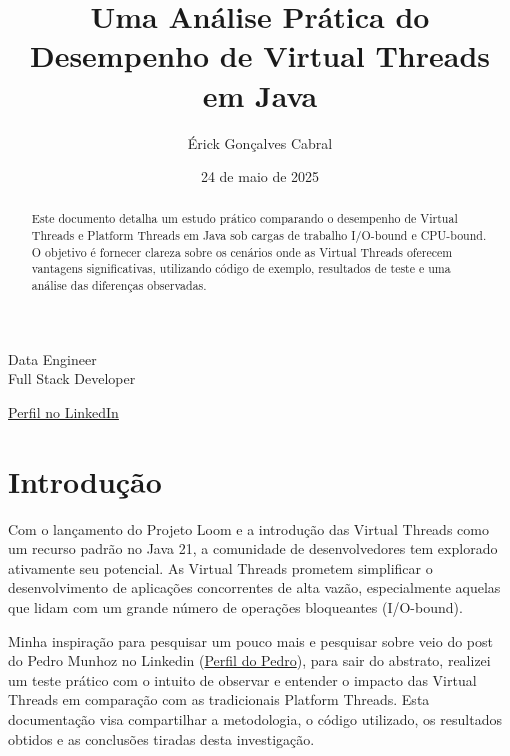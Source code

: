 \documentclass[12pt,a4paper]{article}
\title{Uma Análise Prática do Desempenho de Virtual Threads em Java}
\author{Érick Gonçalves Cabral} \\
\date{24 de maio de 2025}
\newcommand{\linkedinErickCabral}{https://www.linkedin.com/in/erick-cabralgca}
\newcommand{\linkedinPedroMunhoz}{https://www.linkedin.com/in/pedro-munhoz-675847222}
\begin{document}
\makeatletter 
\begin{titlepage}
    \centering 
    \vspace*{2.0cm} 
    {\Large \@author \par} 
    \vspace{0.4cm} 
    {\normalsize Data Engineer \\
    Full Stack Developer \par}
    \vfill 

    {\Huge \bfseries \@title \par} 

    \vfill 
    {\large \href{\linkedinErickCabral}{Perfil no LinkedIn} \par} 
    
    \vspace{0.5cm} 
    {\large \@date \par} 
    \vspace*{2cm} 

    \thispagestyle{empty} 
\end{titlepage}
\makeatother 

\begin{abstract}
Este documento detalha um estudo prático comparando o desempenho de Virtual Threads e Platform Threads em Java sob cargas de trabalho I/O-bound e CPU-bound. O objetivo é fornecer clareza sobre os cenários onde as Virtual Threads oferecem vantagens significativas, utilizando código de exemplo, resultados de teste e uma análise das diferenças observadas.
\end{abstract}
\clearpage 
\tableofcontents
\clearpage

\section{Introdução}
Com o lançamento do Projeto Loom e a introdução das Virtual Threads como um recurso padrão no Java 21, a comunidade de desenvolvedores tem explorado ativamente seu potencial. As Virtual Threads prometem simplificar o desenvolvimento de aplicações concorrentes de alta vazão, especialmente aquelas que lidam com um grande número de operações bloqueantes (I/O-bound).

Minha inspiração para pesquisar um pouco mais e pesquisar sobre veio do post do Pedro Munhoz no Linkedin (\href{\linkedinPedroMunhoz}{Perfil do Pedro}), para sair do abstrato, realizei um teste prático com o intuito de observar e entender o impacto das Virtual Threads em comparação com as tradicionais Platform Threads. Esta documentação visa compartilhar a metodologia, o código utilizado, os resultados obtidos e as conclusões tiradas desta investigação.
\end{document}
